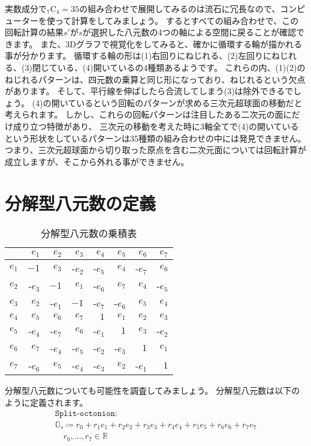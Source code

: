 \documentclass[a4paper,12pt,notitlepage]{jsreport}
\begin{document}
実数成分で${}_7 \mathrm{C}_4=35$の組み合わせで展開してみるのは流石に冗長なので、コンピューターを使って計算をしてみましょう。
するとすべての組み合わせで、この回転計算の結果$s'$が$s$が選択した八元数の4つの軸による空間に戻ることが確認できます。
また、3Dグラフで視覚化をしてみると、確かに循環する輪が描かれる事が分かります。
循環する輪の形は(1)右回りにねじれる、(2)左回りにねじれる、(3)閉じている、(4)開いているの4種類あるようです。
これらの内、(1)(2)のねじれるパターンは、四元数の乗算と同じ形になっており、ねじれるという欠点があります。
そして、平行線を伸ばしたら合流してしまう(3)は除外できるでしょう。
(4)の開いているという回転のパターンが求める三次元超球面の移動だと考えられます。
しかし、これらの回転パターンは注目したある二次元の面にだけ成り立つ特徴があり、
三次元の移動を考えた時に3軸全てで(4)の開いているという形状をしているパターンは35種類の組み合わせの中には発見できません。
つまり、三次元超球面から切り取った原点を含む二次元面については回転計算が成立しますが、そこから外れる事ができません。

\section{分解型八元数の定義}

\begin{wraptable}{r}{8cm}
\caption{分解型八元数の乗積表\label{split-octonion-multiplication-table}}
\centering
\begin{tabular}{rrrrrrrr}\hline
     & $e_1$& $e_2$& $e_3$& $e_4$& $e_5$& $e_6$& $e_7$\\\hline
$e_1$& $ -1$& $e_3$&-$e_2$&-$e_5$& $e_4$&-$e_7$& $e_6$\\\hline
$e_2$&-$e_3$& $ -1$& $e_1$&-$e_6$& $e_7$& $e_4$&-$e_5$\\\hline
$e_3$& $e_2$&-$e_1$& $ -1$&-$e_7$&-$e_6$& $e_5$& $e_4$\\\hline
$e_4$& $e_5$& $e_6$& $e_7$& $  1$& $e_1$& $e_2$& $e_3$\\\hline
$e_5$&-$e_4$&-$e_7$& $e_6$&-$e_1$& $  1$& $e_3$&-$e_2$\\\hline
$e_6$& $e_7$&-$e_4$&-$e_5$&-$e_2$&-$e_3$& $  1$& $e_1$\\\hline
$e_7$&-$e_6$& $e_5$&-$e_4$&-$e_3$& $e_2$&-$e_1$& $  1$\\\hline
\end{tabular}
\end{wraptable}

分解型八元数についても可能性を調査してみましょう。
分解型八元数は以下のように定義されます。
\begin{multline}
\texttt{Split-octonion}:\\
\mathbb{O}_s\coloneq r_0+r_1e_1+r_2e_2+r_3e_3+r_4e_4+r_5e_5+r_6e_6+r_7e_7\\
\quad r_0,...,r_7\in\mathbb{R}
\end{multline}
\end{document}
